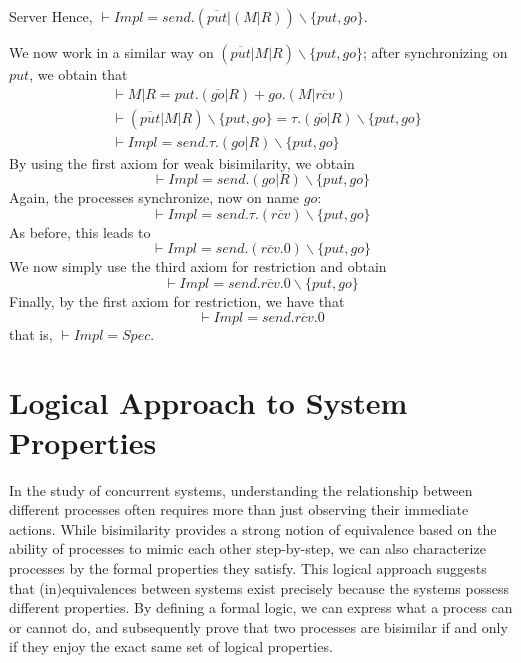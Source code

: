 \begin{Example}{Server}{}
    Hence, $\vdash Impl = send.(\overline{put}|(M |R))\backslash\{put, go\}$.
    
    We now work in a similar way on $(\overline{put}|M |R)\backslash\{put, go\}$; after synchronizing on $put$, we obtain that
    \begin{align*}
        &\vdash M|R = put.(\overline{go}|R) + go.(M|\overline{rcv})\\
        &\vdash (\overline{put}|M|R)\backslash\{put, go\} = \tau.(\overline{go}|R)\backslash\{put, go\}\\
        &\vdash Impl = send.\tau.(go|R)\backslash\{put, go\}
    \end{align*}
    By using the first axiom for weak bisimilarity, we obtain
    \begin{equation*}
        \vdash Impl = send.(go|R)\backslash\{put, go\}
    \end{equation*}
    Again, the processes synchronize, now on name $go$:
    \begin{equation*}
        \vdash Impl = send.\tau.(\overline{rcv})\backslash\{put, go\}    
    \end{equation*}
    As before, this leads to
    \begin{equation*}
        \vdash Impl = send.(\overline{rcv}.0)\backslash\{put, go\}        
    \end{equation*}
    We now simply use the third axiom for restriction and obtain
    \begin{equation*}
        \vdash Impl = send.\overline{rcv}.0\backslash\{put, go\}        
    \end{equation*}
    Finally, by the first axiom for restriction, we have that
    \begin{equation*}
        \vdash Impl = send.\overline{rcv}.0    
    \end{equation*}
    that is, $\vdash Impl = Spec$.
\end{Example}

\section{Logical Approach to System Properties}
In the study of concurrent systems, understanding the relationship between different processes often requires more than just observing their immediate actions. While bisimilarity provides a strong notion of equivalence based on the ability of processes to mimic each other step-by-step, we can also characterize processes by the formal properties they satisfy. This logical approach suggests that (in)equivalences between systems exist precisely because the systems possess different properties. By defining a formal logic, we can express what a process can or cannot do, and subsequently prove that two processes are bisimilar if and only if they enjoy the exact same set of logical properties.

